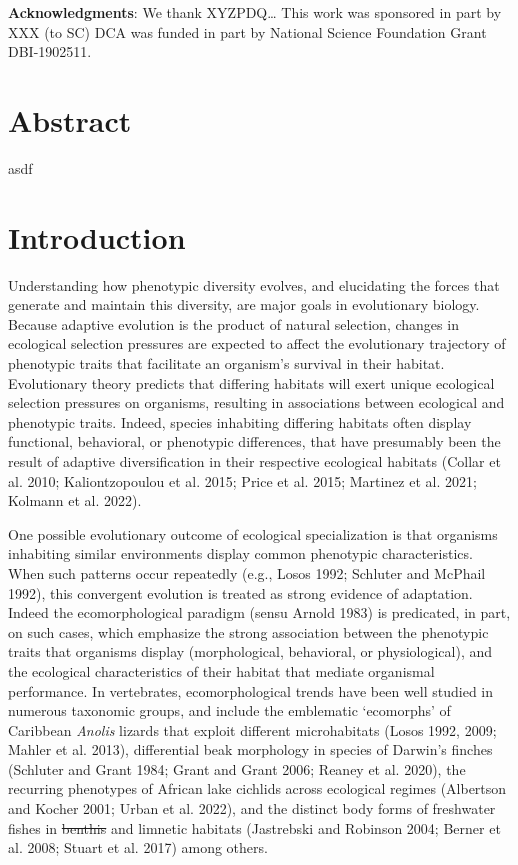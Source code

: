 \documentclass[
  11pt,
]{article}
\providecommand{\DIFaddtex}[1]{{\protect\color{blue}\uwave{#1}}} %
\providecommand{\DIFdeltex}[1]{{\protect\color{red}\sout{#1}}}                      %
\providecommand{\DIFaddbegin}{} %
\providecommand{\DIFaddend}{} %
\providecommand{\DIFdelbegin}{} %
\providecommand{\DIFdelend}{} %
\providecommand{\DIFadd}[1]{\texorpdfstring{\DIFaddtex{#1}}{#1}} %
\providecommand{\DIFdel}[1]{\texorpdfstring{\DIFdeltex{#1}}{}} %
\newcommand{\DIFscaledelfig}{0.5}
\newlength{\DIFdelgraphicswidth} %
\newlength{\DIFdelgraphicsheight} %
\newcommand{\DIFaddincludegraphics}[2][]{{\color{blue}\fbox{\DIFOincludegraphics[#1]{#2}}}} %
\newcommand{\DIFdelincludegraphics}[2][]{%
\sbox{\DIFdelgraphicsbox}{\DIFOincludegraphics[#1]{#2}}%
\settoboxwidth{\DIFdelgraphicswidth}{\DIFdelgraphicsbox} %
\settoboxtotalheight{\DIFdelgraphicsheight}{\DIFdelgraphicsbox} %
\scalebox{\DIFscaledelfig}{%
\parbox[b]{\DIFdelgraphicswidth}{\usebox{\DIFdelgraphicsbox}\\[-\baselineskip] \rule{\DIFdelgraphicswidth}{0em}}\llap{\resizebox{\DIFdelgraphicswidth}{\DIFdelgraphicsheight}{%
\setlength{\unitlength}{\DIFdelgraphicswidth}%
\begin{picture}(1,1)%
\thicklines\linethickness{2pt} %
{\color[rgb]{1,0,0}\put(0,0){\framebox(1,1){}}}%
{\color[rgb]{1,0,0}\put(0,0){\line( 1,1){1}}}%
{\color[rgb]{1,0,0}\put(0,1){\line(1,-1){1}}}%
\end{picture}%
}\hspace*{3pt}}} %
} %
\DeclareRobustCommand{\DIFaddbegin}{\DIFOaddbegin \let\includegraphics\DIFaddincludegraphics} %
\DeclareRobustCommand{\DIFaddend}{\DIFOaddend \let\includegraphics\DIFOincludegraphics} %
\DeclareRobustCommand{\DIFdelbegin}{\DIFOdelbegin \let\includegraphics\DIFdelincludegraphics} %
\DeclareRobustCommand{\DIFdelend}{\DIFOaddend \let\includegraphics\DIFOincludegraphics} %
\begin{document}
\textbf{Acknowledgments}: We thank XYZPDQ\ldots{} This work was
sponsored in part by XXX (to SC) DCA was funded in part by National
Science Foundation Grant DBI-1902511.

\newpage

\hypertarget{abstract}{%
\section{Abstract}\label{abstract}}

asdf

\newpage

\hypertarget{introduction}{%
\section{Introduction}\label{introduction}}

Understanding how phenotypic diversity evolves, and elucidating the
forces that generate and maintain this diversity, are major goals in
evolutionary biology. Because adaptive evolution is the product of
natural selection, changes in ecological selection pressures are
expected to affect the evolutionary trajectory of phenotypic traits that
facilitate an organism's survival in their habitat. Evolutionary theory
predicts that differing habitats will exert unique ecological selection
pressures on organisms, resulting in associations between ecological and
phenotypic traits. Indeed, species inhabiting differing habitats often
display functional, behavioral, or phenotypic differences, that have
presumably been the result of adaptive diversification in their
respective ecological habitats (Collar et al. 2010; Kaliontzopoulou et
al. 2015; Price et al. 2015; Martinez et al. 2021; Kolmann et al. 2022).
\hfill\break

One possible evolutionary outcome of ecological specialization is that
organisms inhabiting similar environments display common phenotypic
characteristics. When such patterns occur repeatedly (e.g., Losos 1992;
Schluter and McPhail 1992), this convergent evolution is treated as
strong evidence of adaptation. Indeed the ecomorphological paradigm
(sensu Arnold 1983) is predicated, in part, on such cases, which
emphasize the strong association between the phenotypic traits that
organisms display (morphological, behavioral, or physiological), and the
ecological characteristics of their habitat that mediate organismal
performance. In vertebrates, ecomorphological trends have been well
studied in numerous taxonomic groups, and include the emblematic
`ecomorphs' of Caribbean \emph{Anolis} lizards that exploit different
microhabitats (Losos 1992, 2009; Mahler et al. 2013), differential beak
morphology in species of Darwin's finches (Schluter and Grant 1984;
Grant and Grant 2006; Reaney et al. 2020), the recurring phenotypes of
African lake cichlids across ecological regimes (Albertson and Kocher
2001; Urban et al. 2022), and the distinct body forms of freshwater
fishes in \DIFdelbegin \DIFdel{benthis }\DIFdelend \DIFaddbegin \DIFadd{benthic }\DIFaddend and limnetic habitats (Jastrebski and Robinson 2004;
Berner et al. 2008; Stuart et al. 2017) among others. \hfill\break
\end{document}
